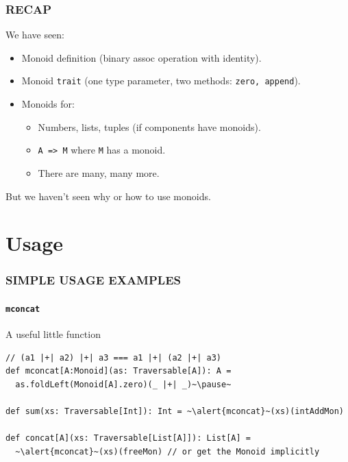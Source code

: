 \documentclass{beamer}
\begin{document}
\begin{frame} \frametitle{RECAP}
  We have seen:
  \begin{itemize}
    \item Monoid definition (binary assoc operation with identity).
    \item Monoid \texttt{trait} (one type parameter,
      two methods: \texttt{zero, append}).
    \item Monoids for:
      \begin{itemize}
      \item Numbers, lists, tuples (if components have monoids).
      \item \texttt{A => M} where \texttt{M} has a monoid.
      \item There are many, many more.
      \end{itemize}
  \end{itemize}

  \begin{block}{}
    \centering
    But we haven't seen \alert{why} or \alert{how} to use monoids.
  \end{block}
\end{frame}

\section{Usage}
\begin{frame}[fragile] \frametitle{SIMPLE USAGE EXAMPLES}
  \framesubtitle{\texttt{mconcat}}

  \begin{block}{A useful little function}
  \begin{lstlisting}
// (a1 |+| a2) |+| a3 === a1 |+| (a2 |+| a3)
def mconcat[A:Monoid](as: Traversable[A]): A =
  as.foldLeft(Monoid[A].zero)(_ |+| _)~\pause~

def sum(xs: Traversable[Int]): Int = ~\alert{mconcat}~(xs)(intAddMon)

def concat[A](xs: Traversable[List[A]]): List[A] =
  ~\alert{mconcat}~(xs)(freeMon) // or get the Monoid implicitly
  \end{lstlisting}
  \end{block}
\end{frame}
\end{document}
